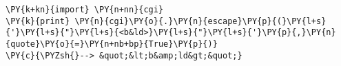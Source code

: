 \begin{Verbatim}[commandchars=\\\{\}]
\PY{k+kn}{import} \PY{n+nn}{cgi}
\PY{k}{print} \PY{n}{cgi}\PY{o}{.}\PY{n}{escape}\PY{p}{(}\PY{l+s}{'}\PY{l+s}{"}\PY{l+s}{<b&ld>}\PY{l+s}{"}\PY{l+s}{'}\PY{p}{,}\PY{n}{quote}\PY{o}{=}\PY{n+nb+bp}{True}\PY{p}{)} 
\PY{c}{\PYZsh{}--> &quot;&lt;b&amp;ld&gt;&quot;}
\end{Verbatim}
